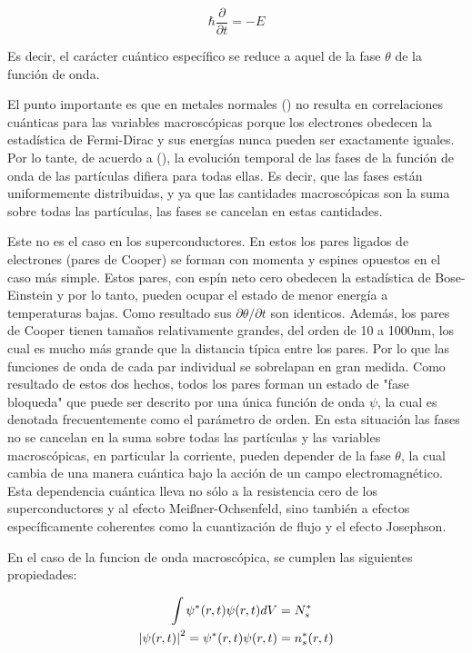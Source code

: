 \begin{equation}
    \hbar \frac{\partial}{\partial t} = - E
\end{equation}

Es decir, el carácter cuántico específico se reduce a aquel de la fase $\theta$ de la función de onda.

El punto importante es que en metales normales () no resulta en correlaciones cuánticas para las variables macroscópicas porque los electrones obedecen la estadística de Fermi-Dirac y sus energías nunca pueden ser exactamente iguales. Por lo tante, de acuerdo a (), la evolución temporal de las fases de la función de onda de las partículas difiera para todas ellas. Es decir, que las fases están uniformemente distribuidas, y ya que las cantidades macroscópicas son la suma sobre todas las partículas, las fases se cancelan en estas cantidades.

Este no es el caso en los superconductores. En estos los pares ligados de electrones (pares de Cooper) se forman con momenta y espines opuestos en el caso más simple. Estos pares, con espín neto cero obedecen la estadística de Bose-Einstein y por lo tanto, pueden ocupar el estado de menor energía a temperaturas bajas. Como resultado sus $\partial \theta / \partial t$ son identicos. Además, los pares de Cooper tienen tamaños relativamente grandes, del orden de 10 a 1000nm, los cual es mucho más grande que la distancia típica entre los pares. Por lo que las funciones de onda de cada par individual se sobrelapan en gran medida. Como resultado de estos dos hechos, todos los pares forman un estado de "fase bloqueda" que puede ser descrito por una única función de onda $\psi$, la cual es denotada frecuentemente como el parámetro de orden. En esta situación las fases no se cancelan en la suma sobre todas las partículas y las variables macroscópicas, en particular la corriente, pueden depender de la fase $\theta$, la cual cambia de una manera cuántica bajo la acción de un campo electromagnético. Esta dependencia cuántica lleva no sólo a la resistencia cero de los superconductores y al efecto Meißner-Ochsenfeld, sino también a efectos específicamente coherentes como la cuantización de flujo y el efecto Josephson.

En el caso de la funcion de onda macroscópica, se cumplen las siguientes propiedades:

\begin{align}
    \int \psi^*(r,t) \psi(r,t) dV &= N^*_s \\
    \abs{\psi(r,t)}^2 = \psi^*(r,t) \psi(r,t) &= n^*_s(r,t)
\end{align}

